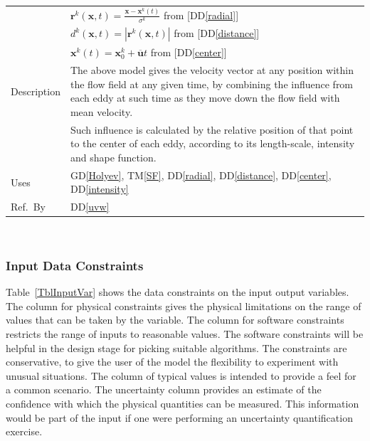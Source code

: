 \documentclass[12pt]{article}
\newcommand{\colAwidth}{0.13\textwidth}
\newcommand{\colBwidth}{0.82\textwidth}
\newcommand{\dref}[1]{GD\ref{#1}}
\newcommand{\ddref}[1]{DD\ref{#1}}
\newcommand{\tref}[1]{TM\ref{#1}}
\begin{document}
\begin{minipage}{\textwidth}
\begin{tabular}{| p{\colAwidth} | p{\colBwidth}|}
  & $\mathbf{r}^k(\mathbf{x},t) = \frac{\mathbf{x}-\mathbf{x}^k(t)}{\sigma^k}$ from [\ddref{radial}]\\
  & $d^k(\mathbf{x},t) = |\mathbf{r}^k(\mathbf{x},t)|$ from [\ddref{distance}]\\
  & $\mathbf{x}^k(t) = \mathbf{x}^k_0 + \mathbf{\overline{u}}t$ from [\ddref{center}]\\
  \hline
  Description
  & The above model gives the velocity vector at any position within the flow field at any given time, by combining the influence from each eddy at such time as they move down the flow field with mean velocity.\\
  & Such influence is calculated by the relative position of that point to the center of each eddy, according to its length-scale, intensity and shape function.
  \\
  \hline
  Uses& \dref{Holyev}, \tref{SF}, \ddref{radial}, \ddref{distance}, \ddref{center}, \ddref{intensity}\\
  \hline
  Ref.\ By & \ddref{uvw}\\
  \hline
\end{tabular}
\end{minipage}\\




\subsubsection{Input Data Constraints} \label{sec_DataConstraints}    

Table~\ref{TblInputVar} shows the data constraints on the input output
variables.  The column for physical constraints gives the physical limitations
on the range of values that can be taken by the variable.  The column for
software constraints restricts the range of inputs to reasonable values.  The
software constraints will be helpful in the design stage for picking suitable
algorithms.  The constraints are conservative, to give the user of the model the
flexibility to experiment with unusual situations.  The column of typical values
is intended to provide a feel for a common scenario.  The uncertainty column
provides an estimate of the confidence with which the physical quantities can be
measured.  This information would be part of the input if one were performing an
uncertainty quantification exercise.
\end{document}

